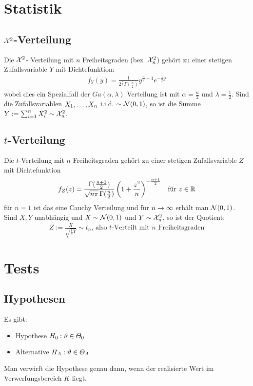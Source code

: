 {\section{Statistik}}
\subsection{$\mathcal{X}^2$-Verteilung}
Die $\mathcal{X}^2$- Verteilung mit $n$ Freiheitsgraden (bez. $\mathcal{X}^2_n$) gehört zu einer
stetigen Zufallsvariable $Y$ mit Dichtefunktion:
\begin{align*}
  f_Y (y) = \frac{1}{2^{\frac{n}{2}}  \Gamma (\frac{n}{2})} y^{\frac{n}{2} - 1} e^{-\frac{1}{2} y}
\end{align*}
wobei dies ein Spezialfall der $Ga (\alpha, \lambda)$ Verteilung ist mit
$\alpha = \frac{n}{2}$ und $\lambda = \frac{1}{2}$. Sind die Zufallsvariablen
$X_1, \dots, X_n$ i.i.d. $\sim \mathcal{N} (0, 1)$, so ist die Summe
$Y := \sum_{i = 1}^n X_i^2 \sim \mathcal{X}^2_n$.
\subsection{$t$-Verteilung}
Die $t$-Verteilung mit $n$ Freiheitsgraden gehört zu einer stetigen
Zufallsvariable $Z$ mit Dichtefunktion
\begin{align*}
  f_Z (z) = \frac{\Gamma (\frac{n+1}{2})}{\sqrt{n \pi} \, \Gamma (\frac{n}{2})} \left( 1 + \frac{z^2}{n} \right)^{-\frac{n+1}{2}}
   &  & \text{für } z \in \mathbb{R}
\end{align*}
für $n = 1$ ist das eine Cauchy Verteilung und für $n \rightarrow \infty$ erhält man
$\mathcal{N} (0, 1)$. Sind $X, Y$ unabhängig und $X \sim \mathcal{N} (0, 1)$
und $Y \sim \mathcal{X}^2_n$, so ist der Quotient:
\begin{align*}
  Z := \frac{X}{\sqrt{\frac{1}{n} Y}} \sim t_n \text{, also $t$-Verteilt mit $n$ Freiheitsgraden}
\end{align*}
\section{Tests}
\subsection{Hypothesen}
Es gibt:
\begin{itemize}
  \item Hypothese $H_0 : \vartheta \in \varTheta_0$
  \item Alternative $H_A : \vartheta \in \varTheta_A$
\end{itemize}
Man verwirft die Hypothese genau dann, wenn der realisierte Wert im
Verwerfungsbereich $K$ liegt.
